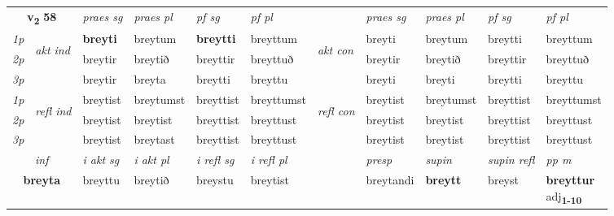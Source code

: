 \noindent
\begin{tabular}{lllllllllll} \toprule
\multicolumn{2}{c}{\textbf{v{\textsubscript{2}}} \Large{\textbf{58}}}  &  \textit{praes sg}  & \textit{praes pl}  &\textit{ pf sg} & \textit{pf pl} &  &  \textit{praes sg}  & \textit{praes pl}  & \textit{pf sg} & \textit{pf pl } \\*
	\cmidrule{3-6} \cmidrule{8-11}
 {\textit{1p}} & \multirow{3}{*}{\begin{turn}{90}\textit{akt ind}\end{turn}} & \textbf{breyti} & breytum & \textbf{breytti} & breyttum & \multirow{3}{*}{\begin{turn}{90}\textit{akt con}\end{turn}} &breyti & breytum & breytti & breyttum\\*
 {\textit{2p}} &  &  breytir  & breytið & breyttir & breyttuð & & breytir & breytið & breyttir & breyttuð \\*
{\textit{3p}} &  & breytir & breyta & breytti & breyttu & & breyti & breyti& breytti & breyttu \\*
\cmidrule{3-6} \cmidrule{8-11}
 {\textit{1p}} & \multirow{3}{*}{\begin{turn}{90}\textit{refl ind}\end{turn}}  & breytist & breytumst & breyttist & breyttumst & \multirow{3}{*}{\begin{turn}{90}\textit{refl con}\end{turn}}  &breytist & breytumst & breyttist & breyttumst \\*
 {\textit{2p}} &  & breytist & breytist & breyttist & breyttust & &breytist & breytist & breyttist & breyttust \\*
 {\textit{3p}}  & & breytist & breytast & breyttist & breyttust & & breytist & breytist& breyttist & breyttust \\*
\cmidrule{3-6} \cmidrule{8-11}

   \multicolumn{2}{c}{\textit{inf}}  & \textit{i akt sg} & \textit{i akt pl} & \textit{i refl sg} & \textit{i refl pl} && \textit{presp} & \textit{supin} & \textit{supin refl} & \textit{pp m} \\*
  \multicolumn{2}{c}{\textbf{breyta}} & breyttu  & breytið & breystu & breytist && breytandi &  \textbf{breytt} & breyst & \specialcell{\textbf{breyttur} \\ adj\textbf{\textsubscript{1-10}}} \\*
\end{tabular}

